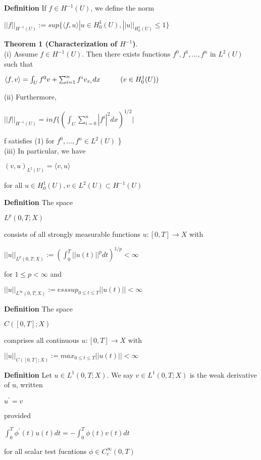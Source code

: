 \documentclass{article}
\newcommand\tab[1][1cm]{\hspace*{#1}}
\begin{document}
\textbf {Definition} If $f \in H^{-1}(U)$, we define the norm
 \begin{center}
$||f||_{H^{-1}(U)} := sup \{ \langle f, u \rangle | u \in H_0^1(U), ||u||_{H_{0}^{1}(U)} \leq 1 \}$
\end{center}

\textbf {Theorem 1 (Characterization of $H^{-1}$)}. \\
\tab (i) Assume $f \in H^{-1}(U)$. Then there exists functions $f^0, f^1 ,..., f^n$ in $L^2(U)$ such that
 \begin{center}
$\langle f, v \rangle = \int_U f^0 v + \sum_{i=1}^n f^{i} v_{x_{i}} dx \tab (v \in H_0^1 (U))$
\end{center}
\tab (ii) Furthermore, 
 \begin{center}
$||f||_{H^{-1}(U)} = inf \{ ( \int_U \sum_{i=0}^n |f^i|^2 dx )^{1/2} |$
\end{center}
\tab \tab f satisfies (1) for $f^0,..., f^n \in L^2(U)$ \} \\
\tab (iii) In particular, we have 
 \begin{center}
$(v, u)_{L^{2}(U)} = \langle v, u \rangle$
\end{center}
for all $u \in H_0^1(U), v \in L^2(U) \subset H^{-1}(U)$

\textbf {Definition} The space
 \begin{center}
$L^p (0, T; X)$
\end{center}
consists of all strongly measurable functions $u: [0, T] \to X$ with 
 \begin{center}
$||u||_{L^{p}(0, T; X)} := ( \int_0^T ||u(t)||^p dt )^{1/p} < \infty$
\end{center}
for $1 \leq p < \infty$ and 
 \begin{center}
$||u||_{L^{\infty}(0, T; X)} := ess sup_{0 \leq t \leq T} ||u(t)||< \infty$
\end{center}

\textbf {Definition} The space
 \begin{center}
$C([0, T]; X)$
\end{center}
comprises all continuous $u : [0, T] \to X$ with 
 \begin{center}
$||u||_{C([0, T]; X)} := max_{0 \leq t \leq T} ||u(t)|| < \infty$
\end{center}

\textbf {Definition} Let $u \in L^1 (0, T; X)$. We say $v \in L^1 (0, T; X)$ is the weak derivative of u, written
 \begin{center}
$u^{'} = v$
\end{center}
provided
 \begin{center}
$\int_0^T \phi^{'}(t) u(t) dt = - \int_0^T \phi(t) v(t) dt$
\end{center}
for all scalar test fucntions $\phi \in C_c^{\infty} (0, T)$
\end{document}
